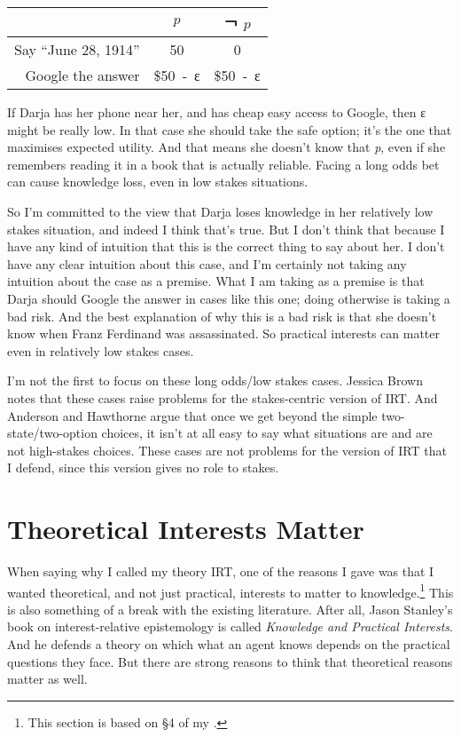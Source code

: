 \documentclass[
  11pt,
]{book}
\begin{document}
\begin{longtable}[]{@{}rcc@{}}
\toprule\noalign{}
~ & \(p\) & ￢ \(p\) \\
\midrule\noalign{}
\endhead
\bottomrule\noalign{}
\endlastfoot
Say ``June 28, 1914'' & 50 & 0 \\
Google the answer & \$50~‑~ε & \$50~‑~ε \\
\end{longtable}

If Darja has her phone near her, and has cheap easy access to Google, then ε might be really low. In that case she should take the safe option; it's the one that maximises expected utility. And that means she doesn't know that \emph{p}, even if she remembers reading it in a book that is actually reliable. Facing a long odds bet can cause knowledge loss, even in low stakes situations.

So I'm committed to the view that Darja loses knowledge in her relatively low stakes situation, and indeed I think that's true. But I don't think that because I have any kind of intuition that this is the correct thing to say about her. I don't have any clear intuition about this case, and I'm certainly not taking any intuition about the case as a premise. What I am taking as a premise is that Darja should Google the answer in cases like this one; doing otherwise is taking a bad risk. And the best explanation of why this is a bad risk is that she doesn't know when Franz Ferdinand was assassinated. So practical interests can matter even in relatively low stakes cases.

I'm not the first to focus on these long odds/low stakes cases. Jessica Brown \citeyearpar[176]{Brown2008} notes that these cases raise problems for the stakes-centric version of IRT. And Anderson and Hawthorne \citeyearpar{AndersonHawthorne2019a} argue that once we get beyond the simple two-state/two-option choices, it isn't at all easy to say what situations are and are not high-stakes choices. These cases are not problems for the version of IRT that I defend, since this version gives no role to stakes.

\hypertarget{whatinterests}{%
\section{Theoretical Interests Matter}\label{whatinterests}}

When saying why I called my theory IRT, one of the reasons I gave was that I wanted theoretical, and not just practical, interests to matter to knowledge.\footnote{This section is based on §4 of my \citeyearpar{Weatherson2017-WEAII}.} This is also something of a break with the existing literature. After all, Jason Stanley's book on interest-relative epistemology is called \emph{Knowledge and Practical Interests}. And he defends a theory on which what an agent knows depends on the practical questions they face. But there are strong reasons to think that theoretical reasons matter as well.
\end{document}
